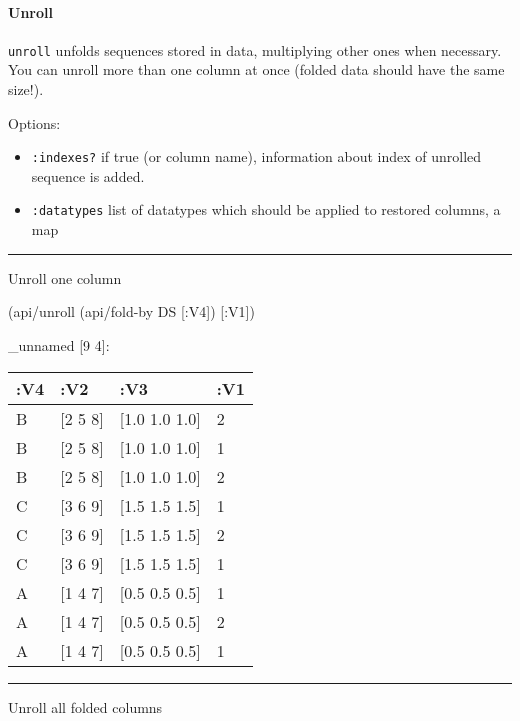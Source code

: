 \documentclass[]{article}
\newenvironment{Shaded}{\begin{snugshade}}{\end{snugshade}}
\newcommand{\AttributeTok}[1]{\textcolor[rgb]{0.77,0.63,0.00}{#1}}
\newcommand{\NormalTok}[1]{#1}
\providecommand{\tightlist}{%
  \setlength{\itemsep}{0pt}\setlength{\parskip}{0pt}}
\let\oldparagraph\paragraph
\renewcommand{\paragraph}[1]{\oldparagraph{#1}\mbox{}}
\begin{document}
\paragraph{Unroll}\label{unroll}

\texttt{unroll} unfolds sequences stored in data, multiplying other ones
when necessary. You can unroll more than one column at once (folded data
should have the same size!).

Options:

\begin{itemize}
\tightlist
\item
  \texttt{:indexes?} if true (or column name), information about index
  of unrolled sequence is added.
\item
  \texttt{:datatypes} list of datatypes which should be applied to
  restored columns, a map
\end{itemize}

\begin{center}\rule{0.5\linewidth}{0.5pt}\end{center}

Unroll one column

\begin{Shaded}
\begin{Highlighting}[]
\NormalTok{(api/unroll (api/fold-by DS [}\AttributeTok{:V4}\NormalTok{]) [}\AttributeTok{:V1}\NormalTok{])}
\end{Highlighting}
\end{Shaded}

\_unnamed {[}9 4{]}:

\begin{longtable}[]{@{}llll@{}}
\toprule
:V4 & :V2 & :V3 & :V1\tabularnewline
\midrule
\endhead
B & {[}2 5 8{]} & {[}1.0 1.0 1.0{]} & 2\tabularnewline
B & {[}2 5 8{]} & {[}1.0 1.0 1.0{]} & 1\tabularnewline
B & {[}2 5 8{]} & {[}1.0 1.0 1.0{]} & 2\tabularnewline
C & {[}3 6 9{]} & {[}1.5 1.5 1.5{]} & 1\tabularnewline
C & {[}3 6 9{]} & {[}1.5 1.5 1.5{]} & 2\tabularnewline
C & {[}3 6 9{]} & {[}1.5 1.5 1.5{]} & 1\tabularnewline
A & {[}1 4 7{]} & {[}0.5 0.5 0.5{]} & 1\tabularnewline
A & {[}1 4 7{]} & {[}0.5 0.5 0.5{]} & 2\tabularnewline
A & {[}1 4 7{]} & {[}0.5 0.5 0.5{]} & 1\tabularnewline
\bottomrule
\end{longtable}

\begin{center}\rule{0.5\linewidth}{0.5pt}\end{center}

Unroll all folded columns
\end{document}
